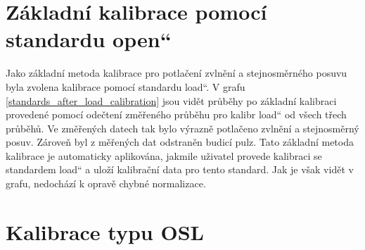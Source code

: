 \section{Základní kalibrace pomocí standardu \quotedblbase open\textquotedblleft}
Jako základní metoda kalibrace pro potlačení zvlnění a stejnosměrného posuvu byla zvolena kalibrace pomocí standardu \quotedblbase load\textquotedblleft . V grafu \ref{standards_after_load_calibration} jsou vidět průběhy po základní kalibraci provedené pomocí odečtení změřeného průběhu pro kalibr \quotedblbase load\textquotedblleft{} od všech třech průběhů. Ve změřených datech tak bylo výrazně potlačeno zvlnění a stejnosměrný posuv. Zároveň byl z měřených dat odstraněn budicí pulz. Tato základní metoda kalibrace je automaticky aplikována, jakmile uživatel provede kalibraci se standardem \quotedblbase load\textquotedblleft{} a uloží kalibrační data pro tento standard. Jak je však vidět v grafu, nedochází k opravě chybné normalizace.

\section{Kalibrace typu OSL}

